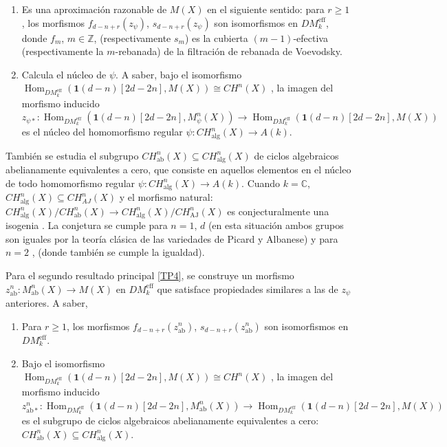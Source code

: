\documentclass[10pt]{amsart}
\theoremstyle{definition}
\theoremstyle{remark}
\theoremstyle{definition}
\begin{document}
\begin{enumerate}
    \item Es una aproximación razonable de $M(X)$ en el siguiente sentido: para $r\geq 1$, los morfismos $f_{d-n+r}(z_{\psi})$, $s_{d-n+r}(z_{\psi})$ son isomorfismos en $DM^{\mathrm{eff}}_{k}$, donde $f_{m}$, $m\in\mathbb{Z}$, (respectivamente $s_{m}$) es la cubierta $(m-1)$-efectiva (respectivamente la $m$-rebanada) de la filtración de rebanada de Voevodsky.

    \item Calcula el núcleo de $\psi$. A saber, bajo el isomorfismo $\operatorname{Hom}_{DM^{\mathrm{eff}}_{k}}(\mathbf{1}(d-n)[2d-2n],M(X))\cong CH^{n}(X)$ \cite[Prop. 2.1.4, Thm. 3.2.6]{Voe00b}, la imagen del morfismo inducido $z_{\psi*}:\operatorname{Hom}_{DM^{\mathrm{eff}}_{k}}(\mathbf{1}(d-n)[2d-2n],M^{n }_{\psi}(X))\to\operatorname{Hom}_{DM^{\mathrm{eff}}_{k}}(\mathbf{1}(d-n)[2d-2n ],M(X))$ es el núcleo del homomorfismo regular $\psi:CH^{n}_{\mathrm{alg}}(X)\to A(k)$.
\end{enumerate}

También se estudia el subgrupo $CH^{n}_{\mathrm{ab}}(X)\subseteq CH^{n}_{\mathrm{alg}}(X)$ de ciclos algebraicos abelianamente equivalentes a cero, que consiste en aquellos elementos en el núcleo de todo homomorfismo regular $\psi:CH^{n}_{\mathrm{alg}}(X)\to A(k)$. Cuando $k=\mathbb{C}$, $CH^{n}_{\mathrm{alg}}(X)\subseteq CH^{n}_{AJ}(X)$ y el morfismo natural: $CH^{n}_{\mathrm{alg}}(X)/CH^{n}_{\mathrm{ab}}(X)\to CH^{n}_{\mathrm{alg}}(X)/CH^ {n}_{\mathrm{AJ}}(X)$ es conjecturalmente una isogenia \cite[p. 447]{Kle71}. La conjetura se cumple para $n=1$, $d$ (en esta situación ambos grupos son iguales por la teoría clásica de las variedades de Picard y Albanese) y para $n=2$ \cite[p. 982 Cor.]{Mur83}, \cite[p. 229 Thm. 1.11.1]{Mur85} (donde también se cumple la igualdad).

Para el segundo resultado principal \ref{TP4}, se construye un morfismo $z^{n}_{\mathrm{ab}}:M^{n}_{\mathrm{ab}}(X)\to M(X)$ en $DM^{\mathrm{eff}}_{k}$ que satisface propiedades similares a las de $z_{\psi}$ anteriores. A saber,

\begin{enumerate}
    \item Para $r\geq 1$, los morfismos $f_{d-n+r}(z^{n}_{\mathrm{ab}})$, $s_{d-n+r}(z^{n}_{\mathrm{ab}})$ son isomorfismos en $DM^{\mathrm{eff}}_{k}$.

    \item Bajo el isomorfismo $\operatorname{Hom}_{DM^{\mathrm{eff}}_{k}}(\mathbf{1}(d-n)[2d-2n],M(X))\cong CH^{n}(X)$ \cite[Prop. 2.1.4, Thm. 3.2.6]{Voe00b}, la imagen del morfismo inducido $z^{n}_{\mathrm{ab}*}:\operatorname{Hom}_{DM^{\mathrm{eff}}_{k}}(\mathbf{1}(d-n )[2d-2n],M^{n}_{\mathrm{ab}}(X))\to\operatorname{Hom}_{DM^{\mathrm{eff}}_{k}}( \mathbf{1}(d-n)[2d-2n],M(X))$ es el subgrupo de ciclos algebraicos abelianamente equivalentes a cero: $CH^{n}_{\mathrm{ab}}(X)\subseteq CH^{n}_{\mathrm{alg}}(X)$.
\end{enumerate}
\end{document}
